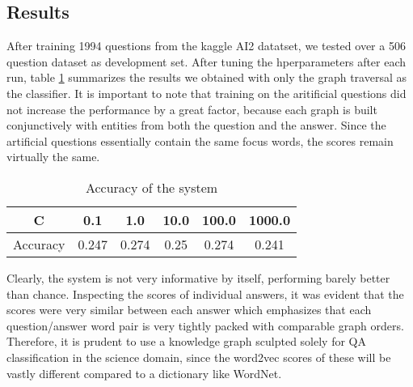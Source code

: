 \subsection{Results}
After training 1994 questions from the kaggle AI2 datatset, we tested over a 506 question dataset
as development set. After tuning the hperparameters after each run, table \ref{wngraph} summarizes
the results we obtained with only the graph traversal as the classifier. It is important to note
that training on the aritificial questions did not increase the performance by a great factor,
because each graph is built conjunctively with entities from both the question and the answer.
Since the artificial questions essentially contain the same focus words, the scores remain virtually
the same.

\begin{table}[htp]
\caption{Accuracy of the system}
\begin{center}
\begin{tabular}{|c|c|c|c|c|c|}
\hline
C&0.1&1.0&10.0&100.0&1000.0\\\hline
Accuracy&0.247&0.274&0.25&0.274&0.241\\
\hline
\end{tabular}
\end{center}
\label{wngraph}
\end{table}

Clearly, the system is not very informative by itself, performing barely better than chance. Inspecting
the scores of individual answers, it was evident that the scores were very similar between each answer
which emphasizes that each question/answer word pair is very tightly packed with comparable graph
orders. Therefore, it is prudent to use a knowledge graph sculpted solely for QA classification in the
science domain, since the word2vec scores of these will be vastly different compared to a dictionary
like WordNet.